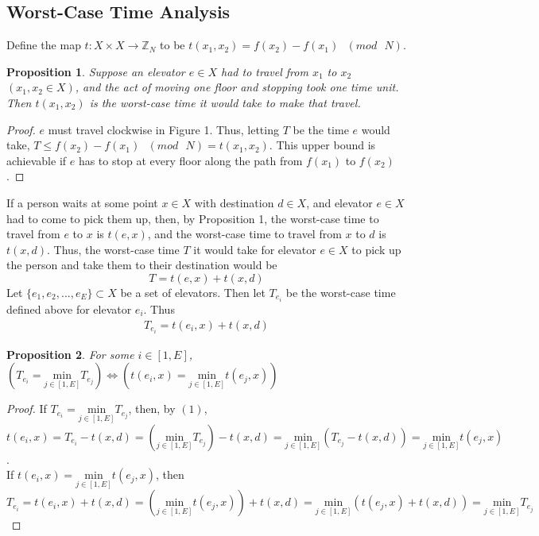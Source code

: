 \documentclass[letterpaper]{article} %
\newtheorem{prop}{Proposition}
\begin{document}
\subsection{Worst-Case Time Analysis}
Define the map $t : X \times X \rightarrow \mathbb{Z}_N$ to be $t(x_1, x_2) = f(x_2) - f(x_1) \text{ } (mod \text{ } N)$. 

\begin{prop}
	Suppose an elevator $e \in X$ had to travel from $x_1$ to $x_2$ $(x_1, x_2 \in X)$, and the act of moving one floor and stopping took one time unit. Then $t(x_1, x_2)$ is the worst-case time it would take to make that travel. 
\end{prop}

\begin{proof}
	$e$ must travel clockwise in Figure 1. Thus, letting $T$ be the time $e$ would take, $T \leq f(x_2) - f(x_1) \text{ } (mod \text{ } N) = t(x_1, x_2)$. This upper bound is achievable if $e$ has to stop at every floor along the path from $f(x_1)$ to $f(x_2)$. 
\end{proof}

If a person waits at some point $x \in X$ with destination $d \in X$, and elevator $e \in X$ had to come to pick them up, then, by Proposition 1, the worst-case time to travel from $e$ to $x$ is $t(e, x)$, and the worst-case time to travel from $x$ to $d$ is $t(x, d)$.  Thus, the worst-case time $T$ it would take for elevator $e \in X$ to pick up the person and take them to their destination would be 
\[
	T = t(e, x) + t(x, d) 
\]
Let $\{e_1, e_2, ... , e_E\} \subset X$ be a set of elevators. Then let $T_{e_i}$ be the worst-case time defined above for elevator $e_i$. Thus 
\begin{align}
	T_{e_i} = t(e_i, x) + t(x, d)
\end{align}

\begin{prop}
	For some $i \in [1, E]$, $\left(T_{e_i} = \underset{j \in [1, E]}{\mathrm{min}} T_{e_j}\right) \Leftrightarrow \left(t(e_i, x) = \underset{j \in [1, E]}{\mathrm{min}} t(e_j, x)\right)$
\end{prop}

\begin{proof}
	If $T_{e_i} = \underset{j \in [1, E]}{\mathrm{min}} T_{e_j}$, then, by $(1)$, $t(e_i, x) = T_{e_i} - t(x, d) = \left(\underset{j \in [1, E]}{\mathrm{min}} T_{e_j} \right) - t(x, d) = \underset{j \in [1, E]}{\mathrm{min}} \left(T_{e_j} - t(x, d)\right) = \underset{j \in [1, E]}{\mathrm{min}} t(e_j, x)$.\\
	If $t(e_i, x) = \underset{j \in [1, E]}{\mathrm{min}} t(e_j, x)$, then $T_{e_i} = t(e_i, x) + t(x, d) = \left(\underset{j \in [1, E]}{\mathrm{min}} t(e_j, x)\right) + t(x, d) = \underset{j \in [1, E]}{\mathrm{min}} (t(e_j, x) + t(x, d)) = \underset{j \in [1, E]}{\mathrm{min}} T_{e_j}$
\end{proof}
\end{document}
